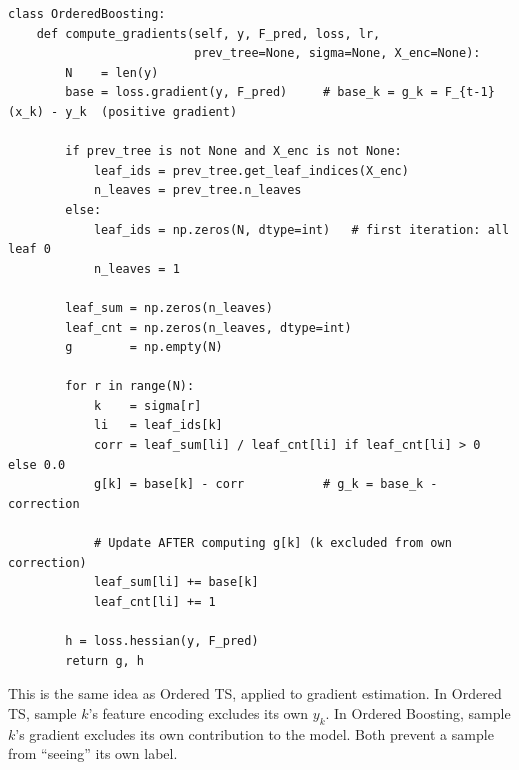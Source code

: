\documentclass[11pt, a4paper]{article}
\begin{document}
\begin{listing}[H]
\caption{Ordered gradient computation (\texttt{boosting.py})}
\begin{verbatim}
class OrderedBoosting:
    def compute_gradients(self, y, F_pred, loss, lr,
                          prev_tree=None, sigma=None, X_enc=None):
        N    = len(y)
        base = loss.gradient(y, F_pred)     # base_k = g_k = F_{t-1}(x_k) - y_k  (positive gradient)

        if prev_tree is not None and X_enc is not None:
            leaf_ids = prev_tree.get_leaf_indices(X_enc)
            n_leaves = prev_tree.n_leaves
        else:
            leaf_ids = np.zeros(N, dtype=int)   # first iteration: all leaf 0
            n_leaves = 1

        leaf_sum = np.zeros(n_leaves)
        leaf_cnt = np.zeros(n_leaves, dtype=int)
        g        = np.empty(N)

        for r in range(N):
            k    = sigma[r]
            li   = leaf_ids[k]
            corr = leaf_sum[li] / leaf_cnt[li] if leaf_cnt[li] > 0 else 0.0
            g[k] = base[k] - corr           # g_k = base_k - correction

            # Update AFTER computing g[k] (k excluded from own correction)
            leaf_sum[li] += base[k]
            leaf_cnt[li] += 1

        h = loss.hessian(y, F_pred)
        return g, h
\end{verbatim}
\end{listing}

This is the same idea as Ordered TS, applied to gradient estimation.
In Ordered TS, sample $k$'s feature encoding excludes its own $y_k$.
In Ordered Boosting, sample $k$'s gradient excludes its own contribution
to the model. Both prevent a sample from ``seeing'' its own label.
\end{document}
